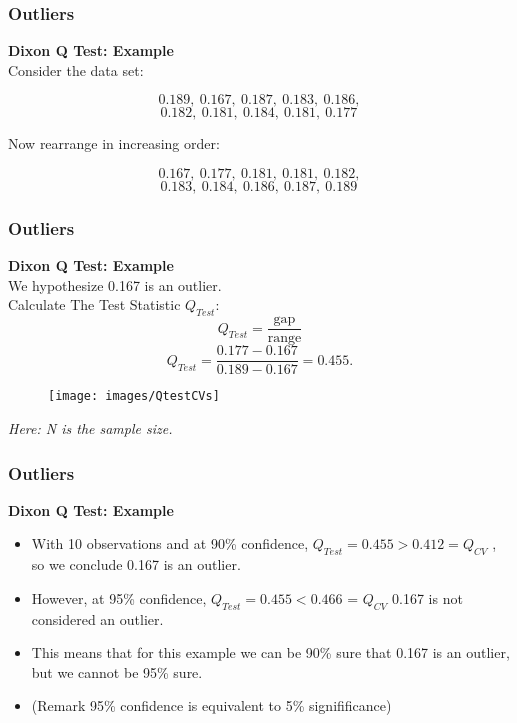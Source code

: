 \documentclass{beamer}
\begin{document}
\begin{frame}[fragile]
	\frametitle{Outliers}
	\Large
	
	\textbf{Dixon Q Test: Example}\\
	Consider the data set:
\begin{framed}
		\[0.189,\ 0.167,\ 0.187,\ 0.183,\ 0.186,\]\[ 0.182,\ 0.181,\ 0.184,\ 0.181,\ 0.177 \,\]
\end{framed}
Now rearrange in increasing order:
	\begin{framed}
	\[0.167,\ 0.177,\ 0.181,\ 0.181,\ 0.182,\]\[ 0.183,\ 0.184,\ 0.186,\ 0.187,\ 0.189 \, \]
\end{framed}
\end{frame}
\begin{frame}[fragile]
	\frametitle{Outliers}
	\Large
	\textbf{Dixon Q Test: Example}\\
		We hypothesize 0.167 is an outlier. \\ Calculate The Test Statistic $Q_{Test}$:
	{
	\[ Q_{Test}=\frac{\text{gap}}{\text{range}}  \]
	\[ Q_{Test} 
	= \frac{0.177-0.167}{0.189-0.167}=0.455.\]
}
\end{frame}

\begin{frame}
	\begin{figure}
\centering
\texttt{[image: images/QtestCVs]}
\end{figure}
\begin{center}
	
\end{center}
\textit{Here: N is the sample size.}
\end{frame}
\begin{frame}[fragile]
	\frametitle{Outliers}
	\Large
	\textbf{Dixon Q Test: Example}\\
	\begin{itemize}
\item	With 10 observations and at 90\% confidence, $Q_{Test} = 0.455 > 0.412 =Q_{CV}$ , so we conclude 0.167 is an outlier.
\item  However, at 95\% confidence, $Q_{Test} = 0.455 < 0.466$ = $Q_{CV}$ 0.167 is not considered an outlier. 

\item This means that for this example we can be 90\% sure that 0.167 is an outlier, but we cannot be 95\% sure.
\bigskip
\item (Remark 95\% confidence is equivalent to 5\% signifificance)
	\end{itemize}	
	

	
\end{frame}
\end{document}
